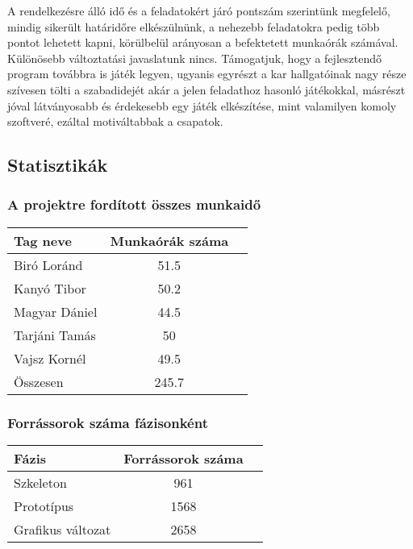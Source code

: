 A rendelkezésre álló idő és a feladatokért járó pontszám szerintünk megfelelő, mindig sikerült határidőre elkészülnünk, a nehezebb feladatokra pedig több pontot lehetett kapni, körülbelül arányosan a befektetett munkaórák számával. Különösebb változtatási javaslatunk nincs. Támogatjuk, hogy a fejlesztendő program továbbra is játék legyen, ugyanis egyrészt a kar hallgatóinak nagy része szívesen tölti a szabadidejét akár a jelen feladathoz hasonló játékokkal, másrészt jóval látványosabb és érdekesebb egy játék elkészítése, mint valamilyen komoly szoftveré, ezáltal motiváltabbak a csapatok.


\subsection{Statisztikák}

\subsubsection{A projektre fordított összes munkaidő}

\begin{tabular}{|p{130pt}|c|p{150pt}|}
\hline 
\textbf{Tag neve} & \textbf{Munkaórák száma}\\ 
\hline 
Biró Loránd & 51.5\\ 
\hline 
Kanyó Tibor & 50.2\\
\hline 
Magyar Dániel & 44.5\\
\hline 
Tarjáni Tamás & 50\\
\hline 
Vajsz Kornél & 49.5\\
\hline 
Összesen & 245.7\\
\hline
\end{tabular}

\newpage

\subsubsection{Forrássorok száma fázisonként}

\begin{tabular}{|p{130pt}|c|p{150pt}|}
\hline 
\textbf{Fázis} & \textbf{Forrássorok száma}\\ 
\hline 
Szkeleton & 961\\ 
\hline 
Prototípus & 1568\\
\hline 
Grafikus változat & 2658\\
\hline
\end{tabular}

